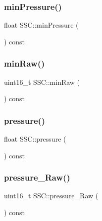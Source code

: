 \mbox{\label{class_s_s_c_a5e83c12a55310a65b957e751fdf09e31}} 
\subsubsection{\texorpdfstring{min\+Pressure()}{minPressure()}}
{\footnotesize\ttfamily float S\+S\+C\+::min\+Pressure (\begin{DoxyParamCaption}{ }\end{DoxyParamCaption}) const\hspace{0.3cm}{\ttfamily [inline]}}

\mbox{\label{class_s_s_c_a2f69b84fd3069cae254957fafbd6e985}} 
\subsubsection{\texorpdfstring{min\+Raw()}{minRaw()}}
{\footnotesize\ttfamily uint16\+\_\+t S\+S\+C\+::min\+Raw (\begin{DoxyParamCaption}{ }\end{DoxyParamCaption}) const\hspace{0.3cm}{\ttfamily [inline]}}

\mbox{\label{class_s_s_c_a3022b28fa8fd9bbeb5f9130f7d624dcb}} 
\subsubsection{\texorpdfstring{pressure()}{pressure()}}
{\footnotesize\ttfamily float S\+S\+C\+::pressure (\begin{DoxyParamCaption}{ }\end{DoxyParamCaption}) const\hspace{0.3cm}{\ttfamily [inline]}}

\mbox{\label{class_s_s_c_a4b550f846ca3da41992221ad40b6cff7}} 
\subsubsection{\texorpdfstring{pressure\+\_\+\+Raw()}{pressure\_Raw()}}
{\footnotesize\ttfamily uint16\+\_\+t S\+S\+C\+::pressure\+\_\+\+Raw (\begin{DoxyParamCaption}{ }\end{DoxyParamCaption}) const\hspace{0.3cm}{\ttfamily [inline]}}

